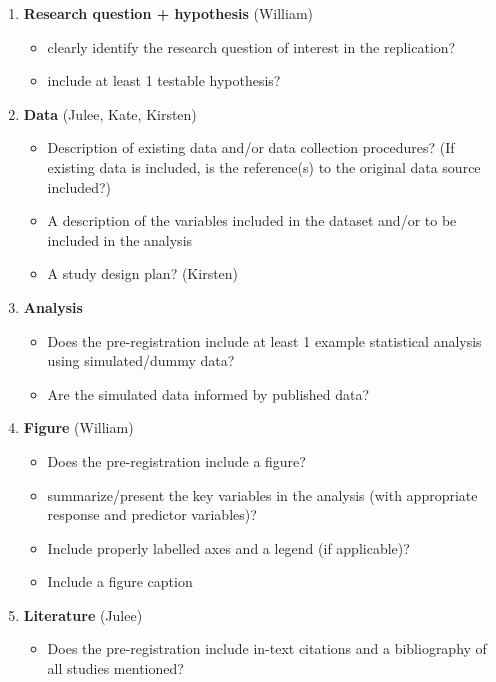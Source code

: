 \documentclass[]{article}
\providecommand{\tightlist}{%
\setlength{\itemsep}{0pt}\setlength{\parskip}{0pt}}
\newcounter{question}
\begin{document}
\begin{enumerate}
\def\labelenumi{\arabic{enumi}.}
\item
  \textbf{Research question + hypothesis} (William)

  \begin{itemize}
  \item
    clearly identify the research question of interest in the
    replication?
  \item
    include at least 1 testable hypothesis?
  \end{itemize}
\item
  \textbf{Data} (Julee, Kate, Kirsten)

  \begin{itemize}
  \item
    Description of existing data and/or data collection procedures? (If
    existing data is included, is the reference(s) to the original data
    source included?)
  \item
    A description of the variables included in the dataset and/or to be
    included in the analysis
  \item
    A study design plan? (Kirsten)
  \end{itemize}
\item
  \textbf{Analysis}

  \begin{itemize}
  \item
    Does the pre-registration include at least 1 example statistical
    analysis using simulated/dummy data?
  \item
    Are the simulated data informed by published data?
  \end{itemize}
\item
  \textbf{Figure} (William)

  \begin{itemize}
  \item
    Does the pre-registration include a figure?
  \item
    summarize/present the key variables in the analysis (with
    appropriate response and predictor variables)?
  \item
    Include properly labelled axes and a legend (if applicable)?
  \item
    Include a figure caption
  \end{itemize}
\item
  \textbf{Literature} (Julee)

  \begin{itemize}
  \tightlist
  \item
    Does the pre-registration include in-text citations and a
    bibliography of all studies mentioned?
  \end{itemize}
\end{enumerate}
\end{document}
